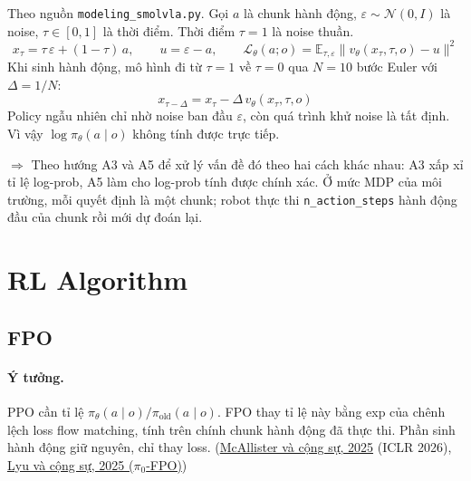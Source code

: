\documentclass[11pt,a4paper]{article}
\newcommand{\code}[1]{\texttt{#1}}
\newcommand{\Lfm}{\mathcal{L}}
\newcommand{\Normal}{\mathcal{N}}
\begin{document}
Theo nguồn \code{modeling\_smolvla.py}. Gọi $a$ là chunk hành động, $\varepsilon \sim \Normal(0, I)$ là noise, $\tau \in [0, 1]$ là thời điểm. Thời điểm $\tau = 1$ là noise thuần.
\begin{equation}
  x_\tau = \tau\,\varepsilon + (1-\tau)\,a, \qquad u = \varepsilon - a, \qquad
  \Lfm_\theta(a; o) = \mathbb{E}_{\tau,\varepsilon}\big\| v_\theta(x_\tau, \tau, o) - u \big\|^2
\end{equation}
Khi sinh hành động, mô hình đi từ $\tau = 1$ về $\tau = 0$ qua $N = 10$ bước Euler với $\Delta = 1/N$:
\begin{equation}
  x_{\tau-\Delta} = x_\tau - \Delta\, v_\theta(x_\tau, \tau, o)
\end{equation}
Policy ngẫu nhiên chỉ nhờ noise ban đầu $\varepsilon$, còn quá trình khử noise là tất định. Vì vậy $\log \pi_\theta(a\mid o)$ không tính được trực tiếp.

$\Rightarrow$ Theo hướng A3 và A5 để xử lý vấn đề đó theo hai cách khác nhau: A3 xấp xỉ tỉ lệ log-prob, A5 làm cho log-prob tính được chính xác.
Ở mức MDP của môi trường, mỗi quyết định là một chunk; robot thực thi \code{n\_action\_steps} hành động đầu của chunk rồi mới dự đoán lại.

\section{RL Algorithm}

\subsection{FPO}

\paragraph{Ý tưởng.}
PPO cần tỉ lệ $\pi_\theta(a\mid o) / \pi_{\text{old}}(a\mid o)$. FPO thay tỉ lệ này bằng exp của chênh lệch loss flow matching, tính trên chính chunk hành động đã thực thi. Phần sinh hành động giữ nguyên, chỉ thay loss.
(\href{https://arxiv.org/abs/2507.21053}{McAllister và cộng sự, 2025} (ICLR 2026), \href{https://arxiv.org/abs/2510.09976}{Lyu và cộng sự, 2025 ($\pi_0$-FPO)})
\end{document}

